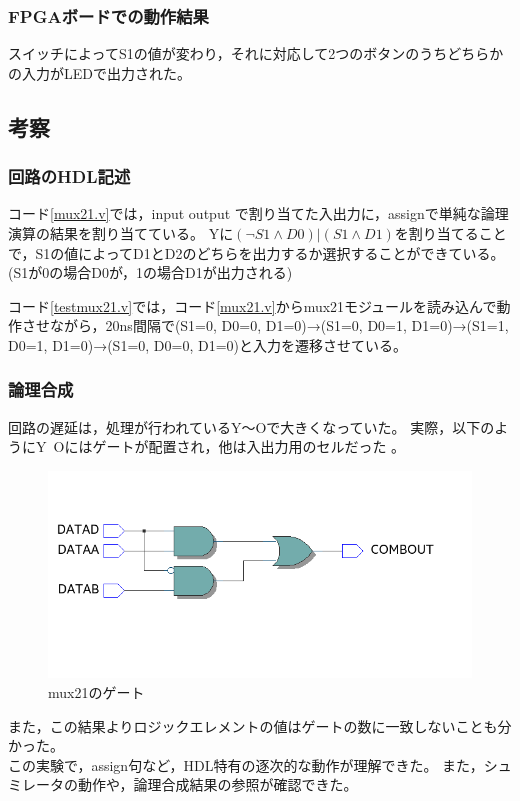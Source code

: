 \subsubsection{FPGAボードでの動作結果}
スイッチによってS1の値が変わり，それに対応して2つのボタンのうちどちらかの入力がLEDで出力された。

\subsection{考察}
\subsubsection{回路のHDL記述}
コード\ref{mux21.v}では，input output で割り当てた入出力に，assignで単純な論理演算の結果を割り当てている。
Yに$(\lnot{S1} \land D0)|(S1 \land D1)$を割り当てることで，S1の値によってD1とD2のどちらを出力するか選択することができている。
(S1が0の場合D0が，1の場合D1が出力される)

コード\ref{testmux21.v}では，コード\ref{mux21.v}からmux21モジュールを読み込んで動作させながら，20ns間隔で(S1=0, D0=0, D1=0)→(S1=0, D0=1, D1=0)→(S1=1, D0=1, D1=0)→(S1=0, D0=0, D1=0)と入力を遷移させている。

\subsubsection{論理合成}
回路の遅延は，処理が行われているY～Oで大きくなっていた。
実際，以下のようにY~Oにはゲートが配置され，他は入出力用のセルだった 。

\begin{figure}[H]
  \centering
  \includegraphics[width=\linewidth]{./src/mux21/mux21elm.png}
  \caption{mux21のゲート}
\end{figure}

また，この結果よりロジックエレメントの値はゲートの数に一致しないことも分かった。\\

この実験で，assign句など，HDL特有の逐次的な動作が理解できた。
また，シュミレータの動作や，論理合成結果の参照が確認できた。

